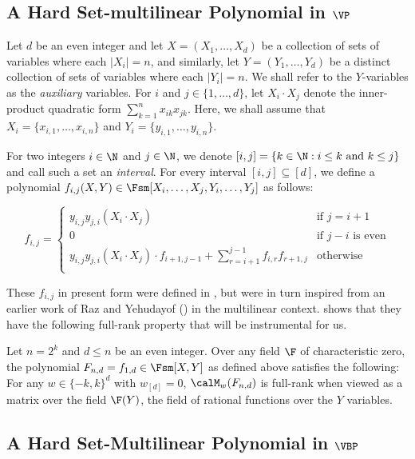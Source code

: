 \documentclass{article}
\begin{document}
\subsection{A Hard Set-multilinear Polynomial in $\VP$}\label{sec:VP}
Let $d$ be an even integer and let $X = (X_1,\ldots, X_{d})$ be a collection of sets of variables where each $|X_i| = n$, and similarly, let $Y = (Y_1,\ldots, Y_{d})$ be a distinct collection of sets of variables where each $|Y_i| = n$. We shall refer to the $Y$-variables as the \emph{auxiliary} variables. For $i$ and $j \in \{1,\ldots,d\}$, let $X_i \cdot X_j$ denote the inner-product quadratic form $\sum_{k = 1}^n x_{ik}x_{jk}$. Here, we shall assume that $X_i = \{x_{i,1},\ldots, x_{i,n}\}$ and $Y_i = \{y_{i,1},\ldots, y_{i,n}\}$.

For two integers $i \in \N$ and $j \in \N$, we denote $[i, j] = \{k \in \N : i \leq k \text{ and } k \leq j\}$ and call such a set an \emph{interval}. For every interval $[i, j] \subseteq [d]$, we define a polynomial $f_{i,j}(X,Y)\in \Fsm[X_i,\ldots,X_j,Y_i,\ldots, Y_j]$ as follows:

\[
f_{i,j} = \begin{cases}
y_{i,j}y_{j,i}(X_i\cdot X_j) &\text{if $j = i+1$}\\
0 &\text{if $j-i$ is even}\\
y_{i,j}y_{j,i}(X_i\cdot X_j)\cdot f_{i+1,j-1} + \sum_{r = i+1}^{j-1} f_{i,r}f_{r+1,j} &\text{otherwise}\\
\end{cases}
\]

These $f_{i,j}$ in present form were defined in \cite{KushS23}, but were in turn inspired from an earlier work of Raz and Yehudayof (\cite{RazY08}) in the multilinear context. \cite{KushS23} shows that they have the following full-rank property that will be instrumental for us.
\begin{lem}\label{lem:Fn-VP-props}
    Let $n = 2^k$ and $d\leq n$ be an even integer. Over any field $\F$ of characteristic zero, the polynomial $F_{n,d} = f_{1,d}\in\Fsm[X,Y]$ as defined above satisfies the following: For any $w\in\{-k,k\}^d$ with $w_{[d]} = 0$, $\calM_w(F_{n,d})$ is full-rank when viewed as a matrix over the field $\F(Y)$, the field of rational functions over the $Y$ variables.
\end{lem}

\subsection{A Hard Set-Multilinear Polynomial in $\VBP$}\label{subsec:VBP}
\end{document}
